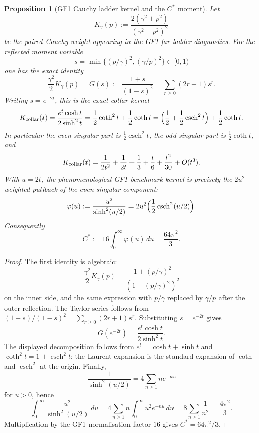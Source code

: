 \documentclass[11pt,a4paper]{article}
\newtheorem{proposition}[proposition]{Proposition}
\theoremstyle{remark}
\theoremstyle{plain}
\begin{document}
\begin{proposition}[GF1 Cauchy ladder kernel and the \(C^*\) moment]
\label{prop:gf1-collar-kernel-cstar}
Let
\[
  K_\gamma(p):=\frac{2(\gamma^2+p^2)}{(\gamma^2-p^2)^2}
\]
be the paired Cauchy weight appearing in the GF1 far-ladder
diagnostics.  For the reflected moment variable
\[
  s=\min\{(p/\gamma)^2,(\gamma/p)^2\}\in[0,1)
\]
one has the exact identity
\[
  \frac{\gamma^2}{2}K_\gamma(p)
  =G(s):=\frac{1+s}{(1-s)^2}
  =\sum_{r\ge0}(2r+1)s^r.
\]
Writing \(s=e^{-2t}\), this is the exact collar kernel
\[
  K_{\rm collar}(t)
  =\frac{e^t\cosh t}{2\sinh^2t}
  =\frac12\coth^2t+\frac12\coth t
  =\Bigl(\frac12+\frac12\operatorname{csch}^2t\Bigr)
    +\frac12\coth t .
\]
In particular the even singular part is
\(\frac12\operatorname{csch}^2t\), the odd singular part is
\(\frac12\coth t\), and
\[
  K_{\rm collar}(t)
  =\frac{1}{2t^2}+\frac{1}{2t}+\frac13+\frac{t}{6}
    +\frac{t^2}{30}+O(t^3).
\]
With \(u=2t\), the phenomenological GF1 benchmark kernel is precisely
the \(2u^2\)-weighted pullback of the even singular component:
\[
  \varphi(u):=\frac{u^2}{\sinh^2(u/2)}
  =2u^2\Bigl(\frac12\operatorname{csch}^2(u/2)\Bigr).
\]
Consequently
\[
  C^*:=16\int_0^\infty \varphi(u)\,du
  =\frac{64\pi^2}{3}.
\]
\end{proposition}

\begin{proof}
The first identity is algebraic:
\[
  \frac{\gamma^2}{2}K_\gamma(p)
  =\frac{1+(p/\gamma)^2}{(1-(p/\gamma)^2)^2}
\]
on the inner side, and the same expression with \(p/\gamma\) replaced
by \(\gamma/p\) after the outer reflection.  The Taylor series follows
from \((1+s)/(1-s)^2=\sum_{r\ge0}(2r+1)s^r\).  Substituting
\(s=e^{-2t}\) gives
\[
  G(e^{-2t})=\frac{e^t\cosh t}{2\sinh^2t}.
\]
The displayed decomposition follows from
\(e^t=\cosh t+\sinh t\) and \(\coth^2t=1+\operatorname{csch}^2t\);
the Laurent expansion is the standard expansion of \(\coth\) and
\(\operatorname{csch}^2\) at the origin.  Finally,
\[
  \frac{1}{\sinh^2(u/2)}
  =4\sum_{n\ge1}n e^{-nu}
\]
for \(u>0\), hence
\[
  \int_0^\infty \frac{u^2}{\sinh^2(u/2)}\,du
  =4\sum_{n\ge1}n\int_0^\infty u^2e^{-nu}\,du
  =8\sum_{n\ge1}\frac1{n^2}
  =\frac{4\pi^2}{3}.
\]
Multiplication by the GF1 normalisation factor \(16\) gives
\(C^*=64\pi^2/3\).
\end{proof}
\end{document}
